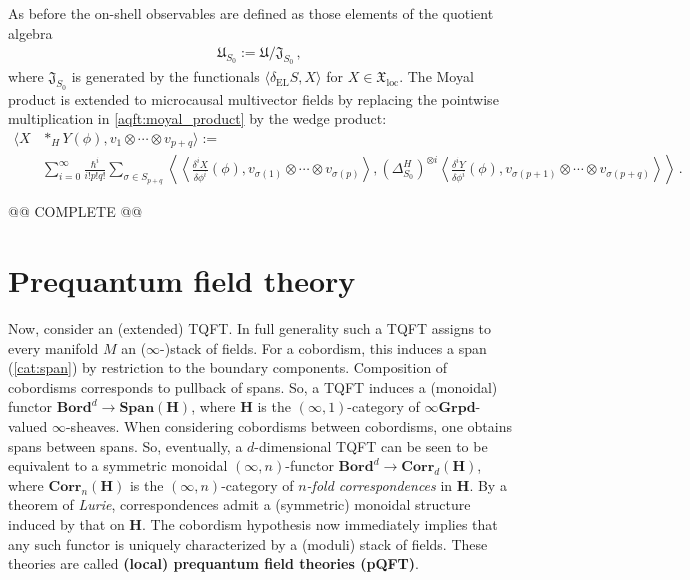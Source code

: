     As before the on-shell observables are defined as those elements of the quotient algebra
    \begin{gather}
        \mathfrak{U}_{S_0} := \mathfrak{U}/\mathfrak{J}_{S_0}\,,
    \end{gather}
    where $\mathfrak{J}_{S_0}$ is generated by the functionals $\langle\delta_{\text{EL}}S,X\rangle$ for $X\in\mathfrak{X}_{\text{loc}}$. The Moyal product is extended to microcausal multivector fields by replacing the pointwise multiplication in \cref{aqft:moyal_product} by the wedge product:
    \begin{align}
        \langle X\!&\ast_H\!Y(\phi),v_1\otimes\cdots\otimes v_{p+q} \rangle := \\
        &\sum_{i=0}^\infty\frac{\hbar^i}{i!p!q!}\sum_{\sigma\in S_{p+q}}\left\langle\!\!\left\langle\frac{\delta^iX}{\delta\phi^i}(\phi),v_{\sigma(1)}\otimes\cdots\otimes v_{\sigma(p)}\right\rangle,(\Delta^H_{S_0})^{\otimes i}\left\langle\frac{\delta^iY}{\delta\phi^i}(\phi),v_{\sigma(p+1)}\otimes\cdots\otimes v_{\sigma(p+q)}\right\rangle\!\!\right\rangle\,.\nonumber
    \end{align}

    @@ COMPLETE @@

\section{Prequantum field theory}

    Now, consider an (extended) TQFT. In full generality such a TQFT assigns to every manifold $M$ an ($\infty$-)stack of fields. For a cobordism, this induces a span (\cref{cat:span}) by restriction to the boundary components. Composition of cobordisms corresponds to pullback of spans. So, a TQFT induces a (monoidal) functor $\mathbf{Bord}^d\rightarrow\mathbf{Span}(\mathbf{H})$, where $\mathbf{H}$ is the $(\infty,1)$-category of $\infty\mathbf{Grpd}$-valued $\infty$-sheaves. When considering cobordisms between cobordisms, one obtains spans between spans. So, eventually, a $d$-dimensional TQFT can be seen to be equivalent to a symmetric monoidal $(\infty,n)$-functor $\mathbf{Bord}^d\rightarrow\mathbf{Corr}_d(\mathbf{H})$, where $\mathbf{Corr}_n(\mathbf{H})$ is the $(\infty,n)$-category of \textit{$n$-fold correspondences} in $\mathbf{H}$. By a theorem of \textit{Lurie}, correspondences admit a (symmetric) monoidal structure induced by that on $\mathbf{H}$. The cobordism hypothesis now immediately implies that any such functor is uniquely characterized by a (moduli) stack of fields. These theories are called \textbf{(local) prequantum field theories (pQFT)}.

